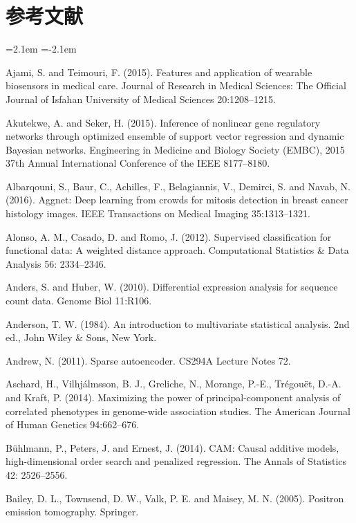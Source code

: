 
\chapter*{参考文献}
\begingroup
\small\raggedright
{}
\setlength{\emergencystretch}{2em}
\begin{list}{}{\leftmargin=2.1em  
  \itemindent=-2.1em \parsep=0pt \itemsep=2pt \topsep=0pt}
\item Ajami, S. and Teimouri, F. (2015). Features and application of wearable biosensors in medical care. Journal of Research in Medical Sciences: The Official Journal of Isfahan University of Medical Sciences 20:1208--1215.
\item Akutekwe, A. and Seker, H. (2015). Inference of nonlinear gene regulatory networks through optimized ensemble of support vector regression and dynamic Bayesian networks. Engineering in Medicine and Biology Society (EMBC), 2015 37th Annual International Conference of the IEEE 8177--8180.
\item Albarqouni, S., Baur, C., Achilles, F., Belagiannis, V., Demirci, S. and Navab, N. (2016). Aggnet: Deep learning from crowds for mitosis detection in breast cancer histology images. IEEE Transactions on Medical Imaging 35:1313--1321.
\item Alonso, A. M., Casado, D. and Romo, J. (2012). Supervised classification for functional data: A weighted distance approach. Computational Statistics \& Data Analysis 56: 2334--2346.
\item Anders, S. and Huber, W. (2010). Differential expression analysis for sequence count data. Genome Biol 11:R106.
\item Anderson, T. W. (1984). An introduction to multivariate statistical analysis. 2nd ed., John Wiley \& Sons, New York.
\item Andrew, N. (2011). Sparse autoencoder. CS294A Lecture Notes 72.
\item Aschard, H., Vilhjálmsson, B. J., Greliche, N., Morange, P.-E., Trégouët, D.-A. and Kraft, P. (2014). Maximizing the power of principal-component analysis of correlated phenotypes in genome-wide association studies. The American Journal of Human Genetics 94:662--676.
\item Bühlmann, P., Peters, J. and Ernest, J. (2014). CAM: Causal additive models, high-dimensional order search and penalized regression. The Annals of Statistics 42: 2526--2556.
\item Bailey, D. L., Townsend, D. W., Valk, P. E. and Maisey, M. N. (2005). Positron emission tomography. Springer.

\end{list}
